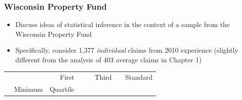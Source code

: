 \documentclass[]{book}
\theoremstyle{definition}
\theoremstyle{definition}
\theoremstyle{definition}
\theoremstyle{remark}
\begin{document}
\subsubsection{Wisconsin Property Fund}\label{wisconsin-property-fund}

\begin{itemize}
\item
  Discuss ideas of statistical inference in the context of a sample from
  the Wisconsin Property Fund
\item
  Specifically, consider 1,377 \emph{individual} claims from 2010
  experience (slightly different from the analysis of 403 average claims
  in Chapter 1)
\end{itemize}

\begin{longtable}[]{@{}llrllrlr@{}}
\toprule
\begin{minipage}[t]{0.12\columnwidth}\raggedright\strut
\strut
\end{minipage} & \begin{minipage}[t]{0.12\columnwidth}\raggedright\strut
\strut
\end{minipage} & \begin{minipage}[t]{0.12\columnwidth}\raggedleft\strut
First\strut
\end{minipage} & \begin{minipage}[t]{0.12\columnwidth}\raggedright\strut
\strut
\end{minipage} & \begin{minipage}[t]{0.12\columnwidth}\raggedright\strut
\strut
\end{minipage} & \begin{minipage}[t]{0.12\columnwidth}\raggedleft\strut
Third\strut
\end{minipage} & \begin{minipage}[t]{0.12\columnwidth}\raggedright\strut
\strut
\end{minipage} & \begin{minipage}[t]{0.12\columnwidth}\raggedleft\strut
Standard\strut
\end{minipage}\tabularnewline
\begin{minipage}[t]{0.12\columnwidth}\raggedright\strut
\strut
\end{minipage} & \begin{minipage}[t]{0.12\columnwidth}\raggedright\strut
Minimum\strut
\end{minipage} & \begin{minipage}[t]{0.12\columnwidth}\raggedleft\strut
Quartile\strut

\end{minipage}
\end{longtable}
\end{document}
